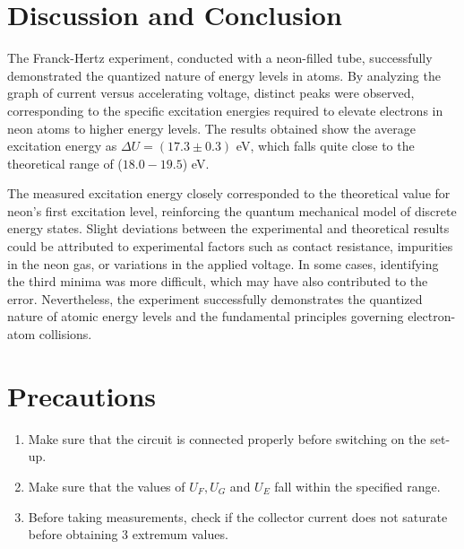\section{Discussion and Conclusion}

The Franck-Hertz experiment, conducted with a neon-filled tube, successfully demonstrated the quantized nature of energy levels in atoms. By analyzing the graph of current versus accelerating voltage, distinct peaks were observed, corresponding to the specific excitation energies required to elevate electrons in neon atoms to higher energy levels.
The results obtained show the average excitation energy as $\Delta U = (17.3 \pm 0.3)$ eV, which falls quite close to the theoretical range of ($18.0-19.5$) eV.

The measured excitation energy closely corresponded to the theoretical value for neon's first excitation level, reinforcing the quantum mechanical model of discrete energy states. Slight deviations between the experimental and theoretical results could be attributed to experimental factors such as contact resistance, impurities in the neon gas, or variations in the applied voltage. In some cases, identifying the third minima was more difficult, which may have also contributed to the error. Nevertheless, the experiment successfully demonstrates the quantized nature of atomic energy levels and the fundamental principles governing electron-atom collisions.

\section{Precautions}

    \begin{enumerate}
        \item Make sure that the circuit is connected properly before switching on the set-up.
        \item Make sure that the values of $U_F, U_G$ and $U_E$ fall within the specified range.
        \item Before taking measurements, check if the collector current does not saturate before obtaining 3 extremum values.
    \end{enumerate}